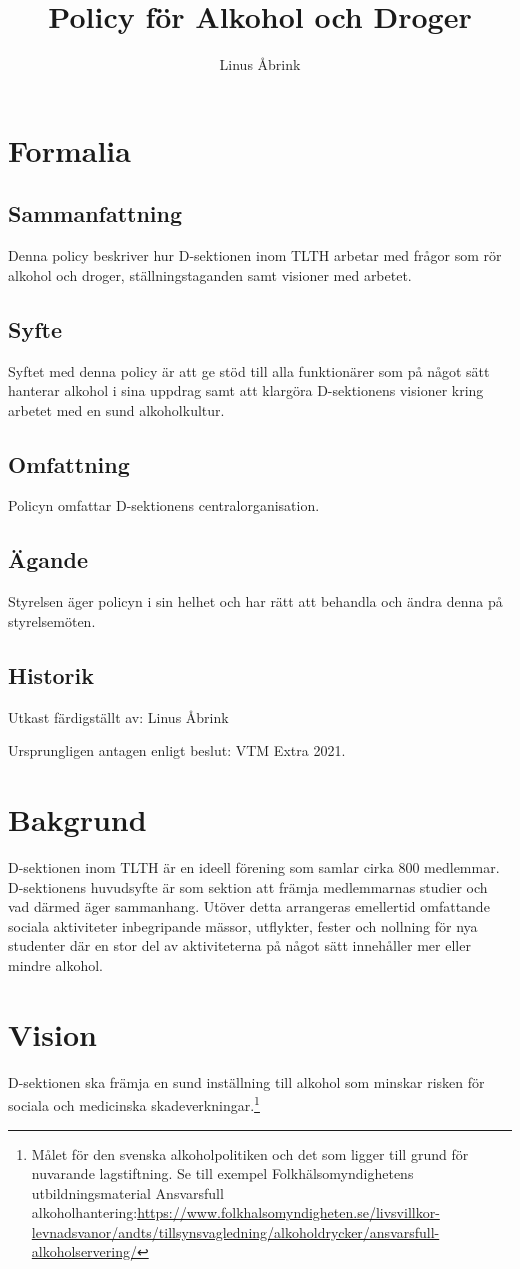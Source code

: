 \documentclass[]{dsekkallelse}
\title{Policy för Alkohol och Droger}
\author{Linus Åbrink}
\begin{document}
\section{Formalia}

\subsection{Sammanfattning}
Denna policy beskriver hur D-sektionen inom TLTH arbetar med frågor som rör alkohol och droger, ställningstaganden samt visioner med arbetet.

\subsection{Syfte}
Syftet med denna policy är att ge stöd till alla funktionärer som på något sätt hanterar alkohol
i sina uppdrag samt att klargöra D-sektionens visioner kring arbetet med en sund alkoholkultur.

\subsection{Omfattning}
Policyn omfattar D-sektionens centralorganisation.

\subsection{Ägande}
Styrelsen äger policyn i sin helhet och har rätt att behandla och ändra denna på styrelsemöten.

\subsection{Historik}
Utkast färdigställt av: Linus Åbrink

Ursprungligen antagen enligt beslut: VTM Extra 2021.


\section{Bakgrund}
D-sektionen inom TLTH är en ideell förening som samlar cirka 800 medlemmar. D-sektionens huvudsyfte är som sektion att främja medlemmarnas studier och vad därmed äger sammanhang. Utöver detta arrangeras emellertid omfattande sociala aktiviteter inbegripande mässor, utflykter, fester och nollning för nya studenter där en stor del av aktiviteterna på något sätt innehåller mer eller mindre alkohol.

\section{Vision}
D-sektionen ska främja en sund inställning till alkohol som minskar risken för sociala och
medicinska skadeverkningar.\footnote{Målet för den svenska alkoholpolitiken och det som ligger till grund för nuvarande lagstiftning. Se till exempel Folkhälsomyndighetens utbildningsmaterial Ansvarsfull alkoholhantering:\url{https://www.folkhalsomyndigheten.se/livsvillkor-levnadsvanor/andts/tillsynsvagledning/alkoholdrycker/ansvarsfull-alkoholservering/}
}
\end{document}
